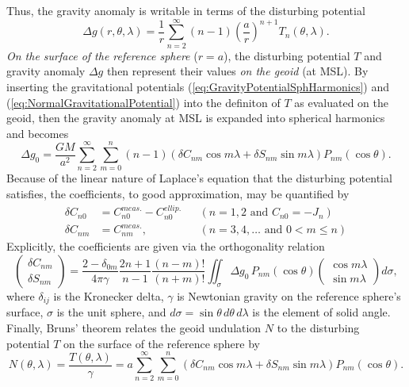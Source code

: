 \documentclass[11pt,dvipsnames]{thesis}
\begin{document}
Thus, the gravity anomaly is writable in terms of the disturbing potential
\begin{equation}
\Delta g(r, \theta, \lambda) = \frac{1}{r} \sum_{n = 2}^\infty (n - 1) \left(\frac{a}{r}\right)^{\!n+1} T_n(\theta, \lambda).
\end{equation}
\textit{On the surface of the reference sphere} ($r = a$), the disturbing potential $T$ and gravity anomaly $\Delta g$ then represent their values \textit{on the geoid} (at MSL).
By inserting the gravitational potentials (\ref{eq:GravityPotentialSphHarmonics}) and (\ref{eq:NormalGravitationalPotential}) into the definiton of $T$ as evaluated on the geoid, then the gravity anomaly at MSL is expanded into spherical harmonics and becomes
\begin{equation}
\Delta g_0  = \frac{GM}{a^2} \sum_{n = 2}^\infty \sum_{m = 0}^n (n - 1) (\delta C_{nm} \cos m\lambda  + \delta S_{nm} \sin m\lambda) P_{nm}(\cos\theta).
\end{equation}
Because of the linear nature of Laplace's equation that the disturbing potential satisfies, the coefficients, to good approximation, may be quantified by
\begin{align}
\delta C_{n0} &= C^{meas.}_{n0} - C^{ellip.}_{n0} && (n = 1,2 \text { and } C_{n0} = -J_n) \\ \delta C_{nm} &= C^{meas.}_{nm}, && (n = 3, 4, \ldots \text{ and } 0 < m \leqslant n)
\end{align}
Explicitly, the coefficients are given via the orthogonality relation
\begin{equation}
\begin{pmatrix}\delta C_{nm} \\ \delta S_{nm}\end{pmatrix} = \frac{2 - \delta_{0m}}{4\pi \gamma} \frac{2n + 1}{n - 1} \frac{(n - m)!}{(n + m)!} \iint_\sigma \Delta g_0 \, P_{nm}(\cos\theta) \begin{pmatrix}\cos m\lambda \\ \sin m\lambda\end{pmatrix} d\sigma,
\end{equation}
where $\delta_{ij}$ is the Kronecker delta, $\gamma$ is Newtonian gravity on the reference sphere's surface, $\sigma$ is the unit sphere, and $d\sigma =  \sin\theta \, d\theta \,d\lambda$ is the element of solid angle.
Finally, Bruns' theorem relates the geoid undulation $N$ to the disturbing potential $T$ on the surface of the reference sphere by
\begin{equation}
N(\theta, \lambda) = \frac{T(\theta, \lambda)}{\gamma} = a \sum_{n = 2}^\infty \sum_{m = 0}^n (\delta C_{nm} \cos m\lambda  + \delta S_{nm} \sin m\lambda) P_{nm}(\cos\theta).
\end{equation}
\end{document}
